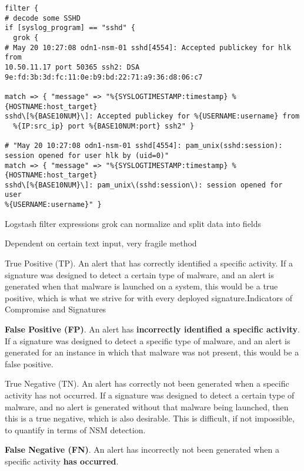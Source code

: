 \documentclass[Screen16to9,17pt]{foils}
\begin{document}
{\footnotesize
\begin{verbatim}
filter {
# decode some SSHD
if [syslog_program] == "sshd" {
  grok {
# May 20 10:27:08 odn1-nsm-01 sshd[4554]: Accepted publickey for hlk from
10.50.11.17 port 50365 ssh2: DSA 9e:fd:3b:3d:fc:11:0e:b9:bd:22:71:a9:36:d8:06:c7

match => { "message" => "%{SYSLOGTIMESTAMP:timestamp} %{HOSTNAME:host_target}
sshd\[%{BASE10NUM}\]: Accepted publickey for %{USERNAME:username} from
  %{IP:src_ip} port %{BASE10NUM:port} ssh2" }

# "May 20 10:27:08 odn1-nsm-01 sshd[4554]: pam_unix(sshd:session):
session opened for user hlk by (uid=0)"
match => { "message" => "%{SYSLOGTIMESTAMP:timestamp} %{HOSTNAME:host_target}
sshd\[%{BASE10NUM}\]: pam_unix\(sshd:session\): session opened for user
%{USERNAME:username}" }
\end{verbatim}
}

\begin{list2}
\item Logstash filter expressions grok can normalize and split data into fields
\item Dependent on certain text input, very fragile method
\end{list2}


\begin{list2}\small
\item True Positive (TP). An alert that has correctly identified a specific activity. If a signature was designed to detect a certain type of malware, and an alert is generated when that malware is launched on a system, this would be a true positive, which is what we strive for with every deployed signature.Indicators of Compromise and Signatures
\item {\bf False Positive (FP)}. An alert has {\bf incorrectly identified a specific activity}. If a signature was designed to detect a specific type of malware, and an alert is generated for an instance in which that malware was not present, this would be a false positive.
\item True Negative (TN). An alert has correctly not been generated when a specific activity has not occurred. If a signature was designed to detect a certain type of malware, and no alert is generated without that malware being launched, then this is a true negative, which is also desirable. This is difficult, if not impossible, to quantify in terms of NSM detection.
\item {\bf False Negative (FN)}. An alert has incorrectly not been generated when a specific activity {\bf has occurred}.
\end{list2}
\end{document}
